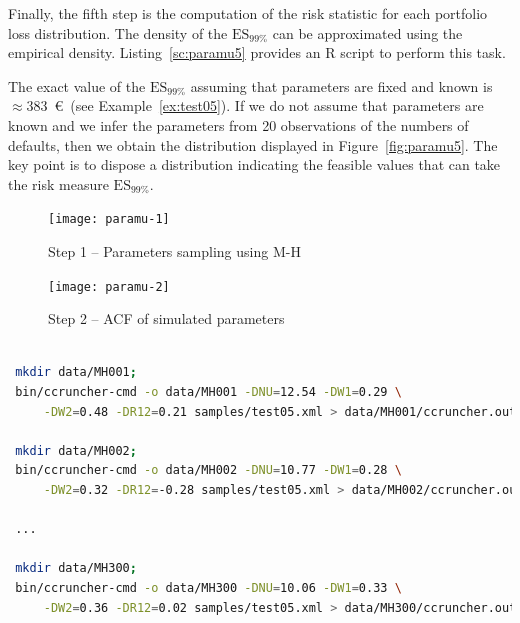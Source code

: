 \documentclass[11pt,fleqn]{book} %
\begin{document}
\begin{example}
	Finally, the fifth step is the computation of the risk statistic
	for each portfolio loss distribution. The density of the $\text{ES}_{99\%}$ 
	can be approximated using the empirical density. Listing~\ref{sc:paramu5}
	provides an R script to perform this task. 

	The exact value of the $\text{ES}_{99\%}$ assuming that parameters are 
	fixed and known is $\approx 383$\ \euro\ (see Example~\ref{ex:test05}). 
	If we do not assume that parameters are known and we infer the parameters 
	from 20 observations of the numbers of defaults, then we obtain the 
	distribution displayed in Figure~\ref{fig:paramu5}. 
	The key point is to dispose a distribution indicating the 
	feasible values that can take the risk measure $\text{ES}_{99\%}$.
\end{example}

\begin{figure}[!ht]
	\centering
	\texttt{[image: paramu-1]}
	\caption{Step 1 -- Parameters sampling using M-H}
	\label{fig:paramu1}
\end{figure}

\begin{figure}[ht]
	\centering
	\texttt{[image: paramu-2]}
	\caption{Step 2 -- ACF of simulated parameters}
	\label{fig:paramu2}
\end{figure}

\begin{lstlisting}[language=bash, label={sc:paramu4}, caption={Execution of multiple CCrunchers (bash script)}]
 
 mkdir data/MH001;
 bin/ccruncher-cmd -o data/MH001 -DNU=12.54 -DW1=0.29 \
     -DW2=0.48 -DR12=0.21 samples/test05.xml > data/MH001/ccruncher.out; 
 
 mkdir data/MH002; 
 bin/ccruncher-cmd -o data/MH002 -DNU=10.77 -DW1=0.28 \
     -DW2=0.32 -DR12=-0.28 samples/test05.xml > data/MH002/ccruncher.out;

 ...

 mkdir data/MH300; 
 bin/ccruncher-cmd -o data/MH300 -DNU=10.06 -DW1=0.33 \
     -DW2=0.36 -DR12=0.02 samples/test05.xml > data/MH300/ccruncher.out; 
 
\end{lstlisting}
\end{document}
